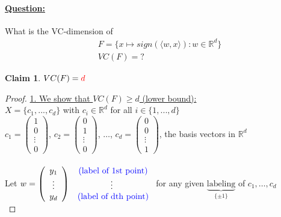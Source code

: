 \documentclass[10pt,a4paper]{article}
\newtheorem*{claim}{Claim}
\theoremstyle{remark}
\theoremstyle{definition}
\theoremstyle{plain}
\begin{document}
\paragraph{\underline{Question:}} What is the VC-dimension of
\begin{align*}
	&F =  \{ x \mapsto sign(\langle w,x \rangle): w \in \mathbb{R}^d \}\\
	&VC(F) = ?
\end{align*}

\begin{claim}$VC(F) = \textcolor{red}{d}$\end{claim}

\begin{proof}

\underline{1. We show that $VC(F)\geq d$ (lower bound):}\\
\newline
	$X = \{ c_1, ..., c_d \}$ with $c_i \in \mathbb{R}^d$ for all $i \in \{ 1, ..., d \}$\\
	$c_1 = \left(\begin{array}{c} 1 \\ 0 \\ \vdots \\ 0 \end{array}\right)$,
	$c_2 = \left(\begin{array}{c} 0 \\ 1 \\ \vdots \\ 0 \end{array}\right)$,
	$\hdots$, 
	$c_d = \left(\begin{array}{c} 0 \\ 0 \\ \vdots \\ 1 \end{array}\right)$, the basis vectors in $\mathbb{R}^d$\\
	\\
	Let 
	$w = \left(\begin{array}{c} 
		y_1 \\
		 \vdots \\
		 y_d \end{array}\right)
		 \begin{array}{c} 
		 	\textcolor{blue}{\text{ (label of 1st point)}}  \\
		 	\vdots \\
		 	\textcolor{blue}{\text{ (label of dth point)}}  
		 \end{array}$ 
	for any given $\underbrace{\text{labeling}}_ {\{ \pm 1 \}}$ of $c_1, \hdots, c_d$\\
	

\end{proof}
\end{document}
